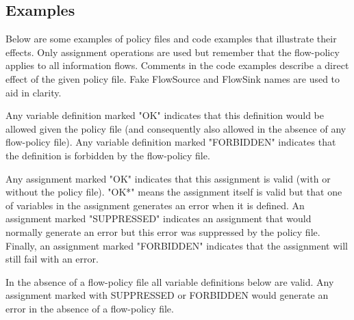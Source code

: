 %
%
%
%

\subsection{Examples}

Below are some examples of policy files and code examples that
illustrate their effects.  Only assignment operations are used
but remember that the flow-policy applies to all information flows.
Comments in the code examples describe a direct effect of the
given policy file.  Fake FlowSource and FlowSink names are used
to aid in clarity.

Any variable definition marked "OK" indicates that this
definition would  be allowed given the policy file
(and consequently also allowed in the absence of any flow-policy
file).  Any variable definition marked "FORBIDDEN" indicates that
the definition is forbidden by the flow-policy file.

Any assignment marked "OK" indicates that this assignment is valid
(with or without the policy file).  "OK*" means the assignment itself
is valid but that one of variables in the assignment generates an
error when it is defined.  An assignment marked "SUPPRESSED"
indicates an assignment that would normally generate an error but
this error was suppressed by the policy file.  Finally, an assignment
marked "FORBIDDEN" indicates that the assignment will still fail
with an error.

In the absence of a flow-policy file all variable definitions
below are valid.  Any assignment marked with SUPPRESSED or FORBIDDEN
would generate an error in the absence of a flow-policy file.

